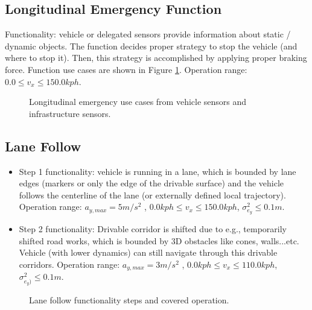 \documentclass[sn-mathphys-num]{sn-jnl}%
\begin{document}
\subsection{Longitudinal Emergency Function}
Functionality: vehicle or delegated sensors provide information about static / dynamic objects. The function decides proper strategy to stop the vehicle 
(and where to stop it). Then, this strategy is accomplished by applying proper braking force. Function use cases are shown in Figure \ref{fig:lon_em}.
Operation range: $0.0 \le v_x \le 150.0 kph$.
\begin{figure}[h]
    \caption{Longitudinal emergency use cases from vehicle sensors and infrastructure sensors.}
    \label{fig:lon_em}
\end{figure}

\subsection{Lane Follow}
\begin{itemize}
    \item Step 1 functionality: vehicle is running in a lane, which is bounded by lane edges (markers or only the edge of the drivable surface) and the vehicle follows the centerline of the lane (or externally defined local trajectory). Operation range: $a_{y,max}=5 m/s^2$ , $0.0 kph \le v_x \le 150.0 kph$, $\sigma_{e_y}^2 \le 0.1 m$.
	\item Step 2 functionality: Drivable corridor is shifted due to e.g., temporarily shifted road works, which is bounded by 3D obstacles like cones, walls...etc. Vehicle (with lower dynamics) can still navigate through this drivable corridors. Operation range: $a_{y,max}=3 m/s^2$ , $0.0 kph \le v_x \le 110.0 kph$, $\sigma_{e_y)}^2 \le 0.1 m$.
\end{itemize}
\begin{figure}[h]
    \caption{Lane follow functionality steps and covered operation.}
    \label{fig:lat_comf}
\end{figure}
\end{document}
